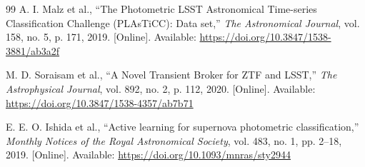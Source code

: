 \documentclass[10pt,journal,compsoc]{IEEEtran}
\begin{document}
\begin{thebibliography}{99}
A. I. Malz et al., ``The Photometric LSST Astronomical Time-series Classification Challenge (PLAsTiCC): Data set,'' \emph{The Astronomical Journal}, vol. 158, no. 5, p. 171, 2019. [Online]. Available: \url{https://doi.org/10.3847/1538-3881/ab3a2f}

M. D. Soraisam et al., ``A Novel Transient Broker for ZTF and LSST,'' \emph{The Astrophysical Journal}, vol. 892, no. 2, p. 112, 2020. [Online]. Available: \url{https://doi.org/10.3847/1538-4357/ab7b71}

E. E. O. Ishida et al., ``Active learning for supernova photometric classification,'' \emph{Monthly Notices of the Royal Astronomical Society}, vol. 483, no. 1, pp. 2--18, 2019. [Online]. Available: \url{https://doi.org/10.1093/mnras/sty2944}

\end{thebibliography}
\end{document}
